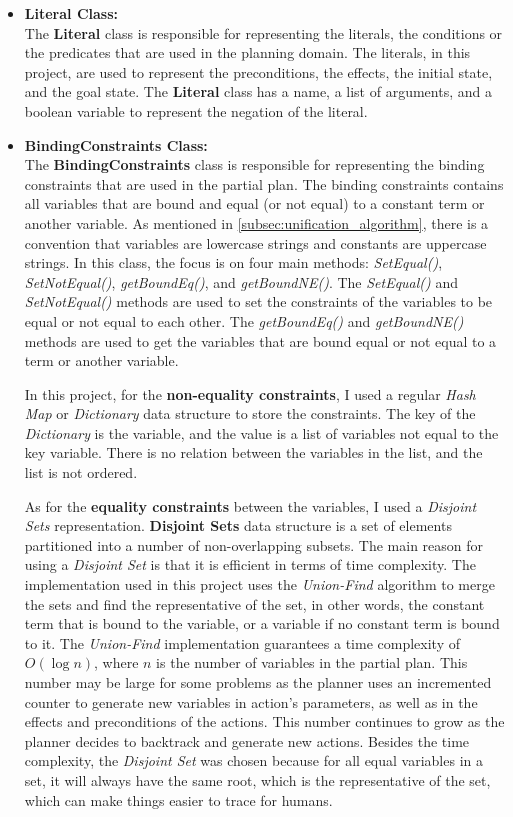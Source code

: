\begin{itemize}
    \item \textbf{Literal Class:} \\
          The \textbf{Literal} class is responsible for representing the literals, the conditions or the predicates that are used in the planning domain. The literals, in this project, are used to represent the preconditions, the effects, the initial state, and the goal state. The \textbf{Literal} class has a name, a list of arguments, and a boolean variable to represent the negation of the literal.

    \item \textbf{BindingConstraints Class:} \\
          The \textbf{BindingConstraints} class is responsible for representing the binding constraints that are used in the partial plan. The binding constraints contains all variables that are bound and equal (or not equal) to a constant term or another variable. As mentioned in \autoref{subsec:unification_algorithm}, there is a convention that variables are lowercase strings and constants are uppercase strings.
          In this class, the focus is on four main methods: \textit{SetEqual()}, \textit{SetNotEqual()}, \textit{getBoundEq()}, and \textit{getBoundNE()}. The \textit{SetEqual()} and \textit{SetNotEqual()} methods are used to set the constraints of the variables to be equal or not equal to each other. The \textit{getBoundEq()} and \textit{getBoundNE()} methods are used to get the variables that are bound equal or not equal to a term or another variable.

          In this project, for the \textbf{non-equality constraints}, I used a regular \textit{Hash Map} or \textit{Dictionary} data structure to store the constraints. The key of the \textit{Dictionary} is the variable, and the value is a list of variables not equal to the key variable. There is no relation between the variables in the list, and the list is not ordered.

          As for the \textbf{equality constraints} between the variables, I used a \textit{Disjoint Sets} representation. \textbf{Disjoint Sets} data structure is a set of elements partitioned into a number of non-overlapping subsets\cite{WikiDisjointSet}\cite{GeeksForGeeksDisjointSet}. The main reason for using a \textit{Disjoint Set} is that it is efficient in terms of time complexity. The implementation used in this project uses the \textit{Union-Find} algorithm to merge the sets and find the representative of the set, in other words, the constant term that is bound to the variable, or a variable if no constant term is bound to it. The \textit{Union-Find} implementation guarantees a time complexity of $O(\log n)$, where $n$ is the number of variables in the partial plan. This number may be large for some problems as the planner uses an incremented counter to generate new variables in action's parameters, as well as in the effects and preconditions of the actions. This number continues to grow as the planner decides to backtrack and generate new actions. Besides the time complexity, the \textit{Disjoint Set} was chosen because for all equal variables in a set, it will always have the same root, which is the representative of the set, which can make things easier to trace for humans.


\end{itemize}
